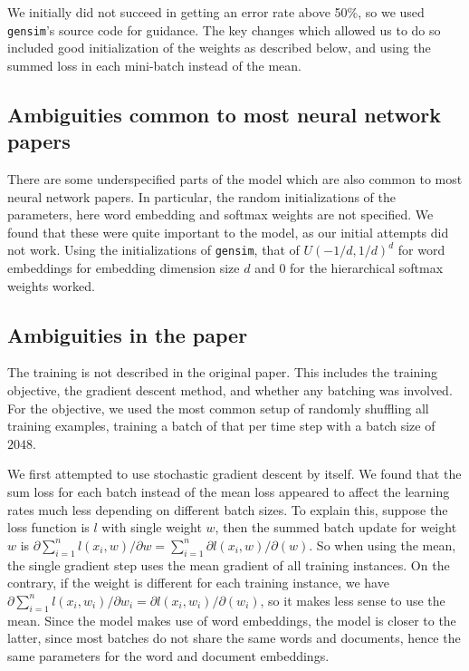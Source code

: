 \documentclass{article}
\begin{document}
We initially did not succeed in getting an error rate above 50\%, so we used \texttt{gensim}'s source code for guidance. The key changes which allowed us to do so included good initialization of the weights as described below, and using the summed loss in each mini-batch instead of the mean.

\subsection{Ambiguities common to most neural network papers}
There are some underspecified parts of the model which are also common to most neural network papers. In particular, the random initializations of the parameters, here word embedding and softmax weights are not specified. We found that these were quite important to the model, as our initial attempts did not work. Using the initializations of \texttt{gensim}, that of $U(-1/d, 1/d)^d$ for word embeddings for embedding dimension size $d$ and $0$ for the hierarchical softmax weights worked.

\subsection{Ambiguities in the paper}
The training is not described in the original paper. This includes the training objective, the gradient descent method, and whether any batching was involved. For the objective, we used the most common setup of randomly shuffling all training examples, training a batch of that per time step with a batch size of $2048$.

We first attempted to use stochastic gradient descent by itself. We found that the sum loss for each batch instead of the mean loss appeared to affect the learning rates much less depending on different batch sizes. To explain this, suppose the loss function is $l$ with single weight $w$, then the summed batch update for weight $w$ is $\partial\sum_{i=1}^n l(x_i, w) / \partial{w} = \sum_{i=1}^n \partial l(x_i, w)/\partial(w)$. So when using the mean, the single gradient step uses the mean gradient of all training instances. On the contrary, if the weight is different for each training instance, we have $\partial\sum_{i=1}^n l(x_i, w_i) / \partial{w_i} = \partial l(x_i, w_i)/\partial(w_i)$, so it makes less sense to use the mean. Since the model makes use of word embeddings, the model is closer to the latter, since most batches do not share the same words and documents, hence the same parameters for the word and document embeddings.
\end{document}
